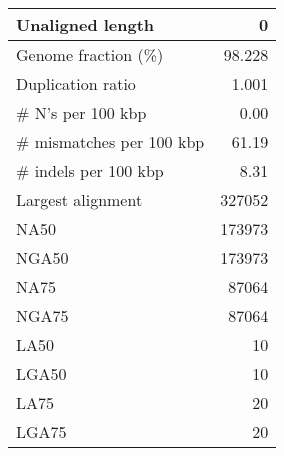 \documentclass[12pt,a4paper]{article}
\begin{document}
\begin{table}[ht]
\begin{center}
\begin{tabular}{|l*{1}{|r}|}
Unaligned length & 0 \\ \hline
Genome fraction (\%) & 98.228 \\ \hline
Duplication ratio & 1.001 \\ \hline
\# N's per 100 kbp & 0.00 \\ \hline
\# mismatches per 100 kbp & 61.19 \\ \hline
\# indels per 100 kbp & 8.31 \\ \hline
Largest alignment & 327052 \\ \hline
NA50 & 173973 \\ \hline
NGA50 & 173973 \\ \hline
NA75 & 87064 \\ \hline
NGA75 & 87064 \\ \hline
LA50 & 10 \\ \hline
LGA50 & 10 \\ \hline
LA75 & 20 \\ \hline
LGA75 & 20 \\ \hline
\end{tabular}
\end{center}
\end{table}
\end{document}
